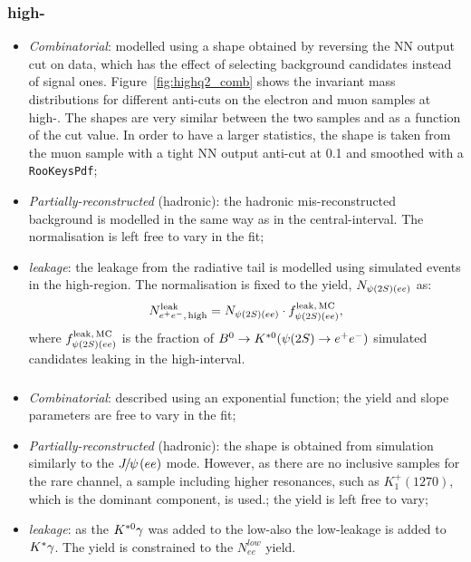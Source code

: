 \subsubsection*{\BdToKstee high-\qsq}
%
\begin{itemize}

\item \textit{Combinatorial}: modelled using a shape obtained by reversing the NN output cut on data,
which has the effect of selecting background candidates instead of signal ones.
Figure~\ref{fig:highq2_comb} shows the invariant mass distributions for different anti-cuts on the electron 
and muon samples at high-\qsq. The shapes are very similar between the two samples and as a function 
of the cut value. In order to have a larger statistics, the shape is taken from the muon sample with a tight
NN output anti-cut at 0.1 and smoothed with a \texttt{RooKeysPdf};

\item \textit{Partially-reconstructed} (hadronic): the hadronic mis-reconstructed background is modelled in 
the same way as in the central-\qsq interval. The normalisation is left free to vary in the fit;

\item \textit{\BdToKstPsi leakage}: the leakage from the \psitwos radiative tail is modelled using simulated 
\BdToKstPsiee events in the high-\qsq region. The normalisation is fixed to 
the \BdToKstPsiee yield, $N_{\psitwos(ee)}$ as:
%
$$N_{\ee, \, {\rm high}}^{\rm leak} = N_{\psitwos(ee)} \cdot f_{\psitwos(ee)}^{\rm leak, \,MC},$$
%
where $f_{\psitwos(ee)}^{\rm leak, \,MC}$ is the fraction of $\Bd\to\Kstarz(\psitwos\to\ee)$ simulated candidates
leaking in the high-\qsq interval.

\end{itemize}

\subsubsection*{\BdToKstG}

\begin{itemize}

\item \textit{Combinatorial}: described using an exponential function; the yield and slope parameters are free to vary in the fit;

\item \textit{Partially-reconstructed} (hadronic): the shape is obtained from simulation similarly to the $\jpsi(ee)$ mode. 
However, as there are no inclusive samples for the rare channel, a sample including higher \Kstarz resonances, 
such as $K_1^+(1270)$, which is the dominant component, is used.; the yield is left free to vary;

\item \textit{\BdToKstee leakage}: as the ${{K}^{*0}}\gamma$ was added to the low-\qsq also the low-\qsq leakage is added
to ${{K}^*}\gamma$. The yield is constrained to the $N_{ee}^{low}$ yield.

\end{itemize}


